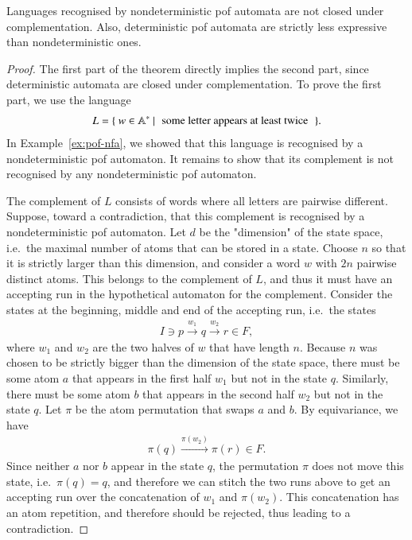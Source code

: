 \begin{theorem}\label{thm:complementation-fails-pof}
    Languages recognised by nondeterministic pof automata are not closed under complementation. Also, deterministic pof automata are strictly less expressive than nondeterministic ones.
\end{theorem}
\begin{proof}
    The first part of the theorem directly implies the second part, since deterministic automata are closed under complementation. To prove the first part, we use the language
    \begin{align*}
        L = \setbuild{w \in \atoms^*}{some letter appears at least twice}.
        \end{align*}
    In Example~\ref{ex:pof-nfa}, we showed that this language is recognised by a nondeterministic pof automaton. It remains to show that its complement  is not recognised by any nondeterministic pof automaton. 
    
    The complement of $L$ consists of words where all letters are pairwise different. Suppose, toward a contradiction,  that this complement  is recognised by a nondeterministic pof automaton. Let $d$ be the "dimension" of the state space, i.e.~the maximal number of atoms that can be stored in a state. Choose $n$ so that it is strictly larger than this dimension, and consider a word $w$ with $2n$ pairwise distinct atoms.
    This belongs to the complement of $L$, and thus it must have an accepting run in the hypothetical automaton for the complement.  Consider the states at the beginning, middle and end of the accepting run, i.e.~the states
    \begin{align*}
   I \ni p \stackrel {w_1} \to q \stackrel {w_2} \to r \in F,
    \end{align*}
    where $w_1$ and $w_2$ are the two halves of $w$ that have length $n$.
   Because $n$ was chosen to be strictly bigger than the dimension of the state space, there must be some atom $a$ that appears in the first half $w_1$ but not in the state $q$. Similarly, there must be some atom $b$ that appears in the second half $w_2$ but not in the state $q$. Let $\pi$ be the atom permutation that swaps $a$ and $b$. By equivariance, we have 
   \begin{align*}
    \pi(q) \stackrel {\pi(w_2)} \to \pi(r) \in F.
   \end{align*}
   Since neither $a$ nor $b$ appear in the state $q$, the permutation $\pi$ does not move this state, i.e.~$\pi(q) = q$, and therefore we can stitch the two runs above to get an accepting run over the concatenation of $w_1$ and $\pi(w_2)$. This concatenation has an atom repetition, and therefore should be rejected, thus leading to a contradiction.
\end{proof}

